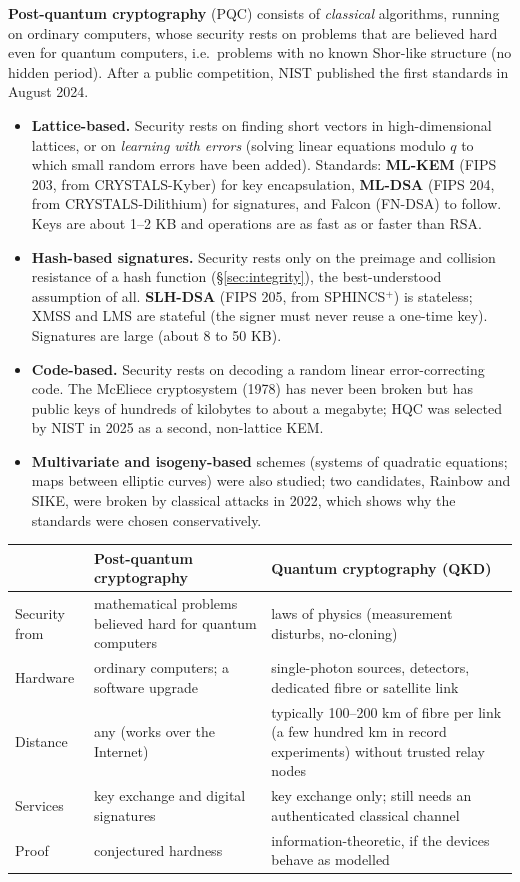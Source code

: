 \textbf{Post-quantum cryptography} (PQC) consists of \emph{classical} algorithms, running on ordinary computers, whose security rests on problems that are believed hard even for quantum computers, i.e.\ problems with no known Shor-like structure (no hidden period). After a public competition, NIST published the first standards in August 2024.
\begin{itemize}
  \item \textbf{Lattice-based.} Security rests on finding short vectors in high-dimensional lattices, or on \emph{learning with errors} (solving linear equations modulo $q$ to which small random errors have been added). Standards: \textbf{ML-KEM} (FIPS 203, from CRYSTALS-Kyber) for key encapsulation, \textbf{ML-DSA} (FIPS 204, from CRYSTALS-Dilithium) for signatures, and Falcon (FN-DSA) to follow. Keys are about 1--2 KB and operations are as fast as or faster than RSA.
  \item \textbf{Hash-based signatures.} Security rests only on the preimage and collision resistance of a hash function (\S\ref{sec:integrity}), the best-understood assumption of all. \textbf{SLH-DSA} (FIPS 205, from SPHINCS$^+$) is stateless; XMSS and LMS are stateful (the signer must never reuse a one-time key). Signatures are large (about 8 to 50 KB).
  \item \textbf{Code-based.} Security rests on decoding a random linear error-correcting code. The McEliece cryptosystem (1978) has never been broken but has public keys of hundreds of kilobytes to about a megabyte; HQC was selected by NIST in 2025 as a second, non-lattice KEM.
  \item \textbf{Multivariate and isogeny-based} schemes (systems of quadratic equations; maps between elliptic curves) were also studied; two candidates, Rainbow and SIKE, were broken by classical attacks in 2022, which shows why the standards were chosen conservatively.
\end{itemize}

\begin{center}\small
\begin{tabularx}{\textwidth}{@{}l X X@{}}
\toprule
 & Post-quantum cryptography & Quantum cryptography (QKD)\\
\midrule
Security from & mathematical problems believed hard for quantum computers & laws of physics (measurement disturbs, no-cloning)\\
Hardware & ordinary computers; a software upgrade & single-photon sources, detectors, dedicated fibre or satellite link\\
Distance & any (works over the Internet) & typically 100--200 km of fibre per link (a few hundred km in record experiments) without trusted relay nodes\\
Services & key exchange and digital signatures & key exchange only; still needs an authenticated classical channel\\
Proof & conjectured hardness & information-theoretic, if the devices behave as modelled\\
\bottomrule
\end{tabularx}
\end{center}

